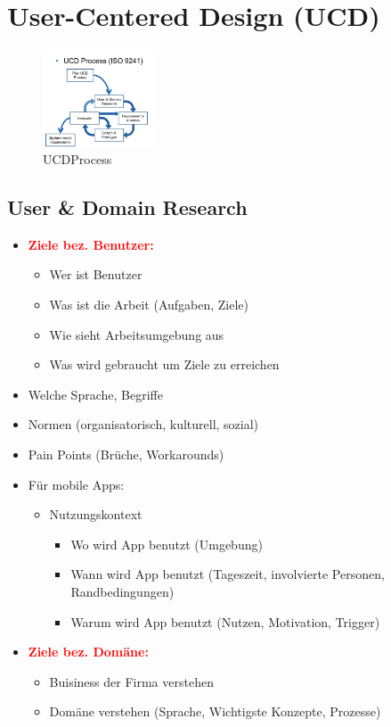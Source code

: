 \documentclass{article}
\begin{document}
\section{User-Centered Design (UCD)}
\begin{figure}[H]
\centering
\includegraphics[width=0.3\textwidth]{Resources/Images/UCD_Process.png}
\caption{\label{fig:UCDProcess} UCDProcess}
\end{figure}


\subsection{User \& Domain Research}
\begin{itemize}
	\item \textcolor{red} {\textbf{Ziele bez. Benutzer:}}
	\begin{itemize}
		\item Wer ist Benutzer
		\item Was ist die Arbeit (Aufgaben, Ziele)
		\item Wie sieht Arbeitsumgebung aus
		\item Was wird gebraucht um Ziele zu erreichen
	\end{itemize}
	\item Welche Sprache, Begriffe
	\item Normen (organisatorisch, kulturell, sozial)
	\item Pain Points (Brüche, Workarounds)
	\item Für mobile Apps:
	\begin{itemize}
		\item Nutzungskontext
		\begin{itemize}
			\item Wo wird App benutzt (Umgebung)
			\item Wann wird App benutzt (Tageszeit, involvierte Personen, Randbedingungen)
			\item Warum wird App benutzt (Nutzen, Motivation, Trigger)
		\end{itemize}
	\end{itemize}
	\item \textcolor{red} {\textbf{Ziele bez. Domäne:}}
	\begin{itemize}
		\item Buisiness der Firma verstehen
		\item Domäne verstehen (Sprache, Wichtigste Konzepte, Prozesse)
	\end{itemize}
	
\end{itemize}
\end{document}

